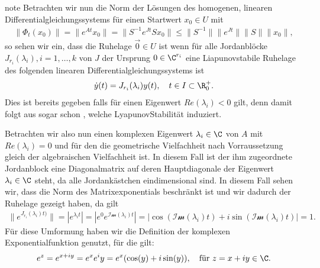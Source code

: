 \documentclass[letterpaper,10pt,english]{jupyterBook}
\begin{document}
\begin{sphinxadmonition}{note}
\sphinxAtStartPar
Betrachten wir nun die Norm der Lösungen des homogenen, linearen Differentialgleichungssystems für einen Startwert \(x_0 \in U\) mit
\begin{equation*}
\begin{split}\| \Phi_t(x_0) \| = \|e^{At}x_0\| = \|S^{-1}e^{Jt}S x_0\| \leq \|S^{-1}\| \|e^{Jt}\| \|S\| \|x_0\|,\end{split}
\end{equation*}
\sphinxAtStartPar
so sehen wir ein, dass die Ruhelage \(\vec{0} \in U\)  ist wenn für alle Jordanblöcke \(J_{r_i}(\lambda_i), i=1,\ldots,k\) von \(J\) der Ursprung \(0\in \C^{r_i}\) eine Liapunov\sphinxhyphen{}stabile Ruhelage des folgenden linearen Differentialgleichungssystems ist
\begin{equation*}
\begin{split} \dot{y}(t) = J_{r_i}(\lambda_i) y(t), \quad t \in I \subset \R^+_0.\end{split}
\end{equation*}
\sphinxAtStartPar
Dies ist bereits gegeben falls für einen Eigenwert \(Re(\lambda_i)<0\) gilt, denn damit folgt aus {\hyperref[\detokenize{ode_stability/ruhelagen:theorem:stabilit_xe4t_linear}]{}} sogar schon , welche Lyapunov\sphinxhyphen{}Stabilität induziert.

\sphinxAtStartPar
Betrachten wir also nun einen komplexen Eigenwert \(\lambda_i \in \C\) von \(A\) mit \(Re(\lambda_i)=0\) und für den die geometrische Vielfachheit nach Vorraussetzung gleich der algebraischen Vielfachheit ist.
In diesem Fall ist der ihm zugeordnete Jordanblock eine Diagonalmatrix auf deren Hauptdiagonale der Eigenwert \(\lambda_i \in \C\) steht, da alle Jordankästchen eindimensional sind.
In diesem Fall sehen wir, dass die Norm des Matrixexponentials beschränkt ist und wir dadurch  der Ruhelage gezeigt haben, da gilt
\begin{equation*}
\begin{split}\|e^{J_{r_i}(\lambda_i)t)}\| = |e^{\lambda_i t}| = |e^0e^{\mathcal{Im}(\lambda_i) t}| = |\cos{(\mathcal{Im}(\lambda_i)t)} + i \sin{(\mathcal{Im}(\lambda_i)t)}| = 1.\end{split}
\end{equation*}
\sphinxAtStartPar
Für diese Umformung haben wir die Definition der komplexen Exponentialfunktion genutzt, für die gilt:
\begin{equation*}
\begin{split}e^z = e^{x+iy} = e^xe^iy = e^x(\cos(y) + i\sin(y)), \quad \text{für } z = x+iy \in \C.\end{split}
\end{equation*}\end{sphinxadmonition}
\end{document}
